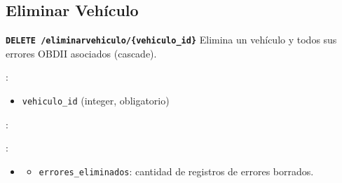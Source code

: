 \documentclass[a4paper,11pt,spanish]{sphinxmanual}
\newcommand{\robotoMonoBold}{\fontseries{b}\selectfont\ttfamily}
\renewcommand{\sphinxcode}[1]{\textcolor{sphinxorangeCode}{{\robotoMonoBold #1}}}
\renewcommand{\sphinxbfcode}[1]{\textbf{\sphinxcode{#1}}}
\renewcommand{\sphinxupquote}[1]{\texttt{#1}}
\begin{document}
\subsection{Eliminar Vehículo}
\label{\detokenize{endpoints:eliminar-vehiculo}}

\begin{fulllineitems}
\label{\detokenize{endpoints:delete--eliminar-vehiculo-vehiculo_id}}
\pysigstartsignatures
\pysigline
{\sphinxbfcode{\sphinxupquote{DELETE~}}\sphinxbfcode{\sphinxupquote{/eliminar\sphinxhyphen{}vehiculo/\{vehiculo\_id\}}}}
\pysigstopsignatures
\sphinxAtStartPar
Elimina un vehículo y todos sus errores OBD\sphinxhyphen{}II asociados (cascade).

\sphinxAtStartPar
{}:
\begin{itemize}
\item {} 
\sphinxAtStartPar
\sphinxcode{\sphinxupquote{vehiculo\_id}} (integer, obligatorio)

\end{itemize}

\sphinxAtStartPar
{}:

\begin{sphinxVerbatim}[commandchars=\\\{\}]
  
 
 
\end{sphinxVerbatim}

\sphinxAtStartPar
{}:
\begin{itemize}
\item {} 
\sphinxAtStartPar
{}

\begin{sphinxVerbatim}[commandchars=\\\{\}]
\end{sphinxVerbatim}
\begin{itemize}
\item {} 
\sphinxAtStartPar
\sphinxcode{\sphinxupquote{errores\_eliminados}}: cantidad de registros de errores borrados.


\end{itemize}
\end{itemize}
\end{fulllineitems}
\end{document}
